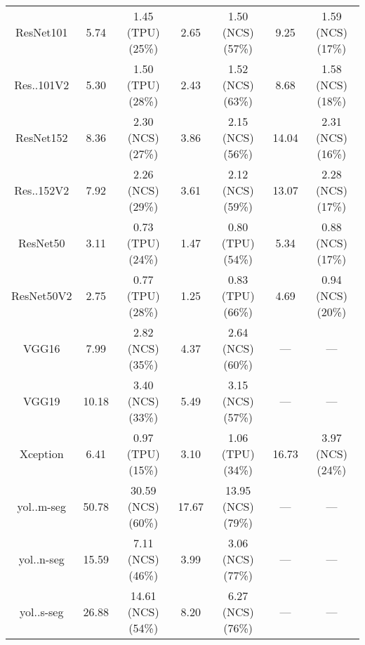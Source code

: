 \begin{tabular}{c|cc|cc|cc}
        ResNet101 & 5.74 & 1.45 (\colorbox{RC}{TPU}) (\colorbox{RC}{25\%}) & 2.65 & 1.50 (\colorbox{RA}{NCS}) (\colorbox{RC}{57\%}) & 9.25 & 1.59 (\colorbox{RA}{NCS}) (\colorbox{RA}{17\%}) \\
        Res..101V2 & 5.30 & 1.50 (\colorbox{RC}{TPU}) (\colorbox{RC}{28\%}) & 2.43 & 1.52 (\colorbox{RA}{NCS}) (\colorbox{RE}{63\%}) & 8.68 & 1.58 (\colorbox{RA}{NCS}) (\colorbox{RA}{18\%}) \\
        ResNet152 & 8.36 & 2.30 (\colorbox{RA}{NCS}) (\colorbox{RC}{27\%}) & 3.86 & 2.15 (\colorbox{RA}{NCS}) (\colorbox{RC}{56\%}) & 14.04 & 2.31 (\colorbox{RA}{NCS}) (\colorbox{RA}{16\%}) \\
        Res..152V2 & 7.92 & 2.26 (\colorbox{RA}{NCS}) (\colorbox{RC}{29\%}) & 3.61 & 2.12 (\colorbox{RA}{NCS}) (\colorbox{RC}{59\%}) & 13.07 & 2.28 (\colorbox{RA}{NCS}) (\colorbox{RA}{17\%}) \\
        ResNet50 & 3.11 & 0.73 (\colorbox{RC}{TPU}) (\colorbox{RC}{24\%}) & 1.47 & 0.80 (\colorbox{RC}{TPU}) (\colorbox{RC}{54\%}) & 5.34 & 0.88 (\colorbox{RA}{NCS}) (\colorbox{RA}{17\%}) \\
        ResNet50V2 & 2.75 & 0.77 (\colorbox{RC}{TPU}) (\colorbox{RC}{28\%}) & 1.25 & 0.83 (\colorbox{RC}{TPU}) (\colorbox{RE}{66\%}) & 4.69 & 0.94 (\colorbox{RA}{NCS}) (\colorbox{RC}{20\%}) \\
        VGG16 & 7.99 & 2.82 (\colorbox{RA}{NCS}) (\colorbox{RC}{35\%}) & 4.37 & 2.64 (\colorbox{RA}{NCS}) (\colorbox{RE}{60\%}) & --- & --- \\
        VGG19 & 10.18 & 3.40 (\colorbox{RA}{NCS}) (\colorbox{RC}{33\%}) & 5.49 & 3.15 (\colorbox{RA}{NCS}) (\colorbox{RC}{57\%}) & --- & --- \\
        Xception & 6.41 & 0.97 (\colorbox{RC}{TPU}) (\colorbox{RA}{15\%}) & 3.10 & 1.06 (\colorbox{RC}{TPU}) (\colorbox{RC}{34\%}) & 16.73 & 3.97 (\colorbox{RA}{NCS}) (\colorbox{RC}{24\%}) \\
        yol..m-seg & 50.78 & 30.59 (\colorbox{RA}{NCS}) (\colorbox{RE}{60\%}) & 17.67 & 13.95 (\colorbox{RA}{NCS}) (\colorbox{RE}{79\%}) & --- & --- \\
        yol..n-seg & 15.59 & 7.11 (\colorbox{RA}{NCS}) (\colorbox{RC}{46\%}) & 3.99 & 3.06 (\colorbox{RA}{NCS}) (\colorbox{RE}{77\%}) & --- & --- \\
        yol..s-seg & 26.88 & 14.61 (\colorbox{RA}{NCS}) (\colorbox{RC}{54\%}) & 8.20 & 6.27 (\colorbox{RA}{NCS}) (\colorbox{RE}{76\%}) & --- & --- \\
    \end{tabular}